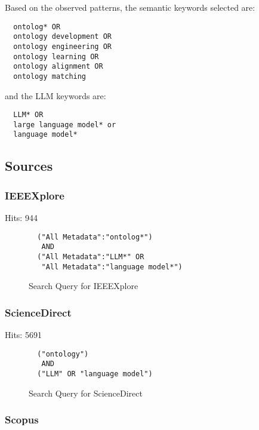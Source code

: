 \documentclass[a4paper,colorinlistoftodos]{article}
\begin{document}
Based on the observed patterns, the semantic keywords selected are:
\begin{lstlisting}
  ontolog* OR
  ontology development OR
  ontology engineering OR
  ontology learning OR
  ontology alignment OR
  ontology matching
\end{lstlisting}

and the LLM keywords are:
\begin{lstlisting}
  LLM* OR
  large language model* or
  language model*
\end{lstlisting}

\subsection{Sources}
\label{subsec:sources}

\subsubsection{IEEEXplore}
\label{subsubsec:ieeexplore}

Hits: 944

\begin{figure}[H]
\begin{lstlisting}
  ("All Metadata":"ontolog*")
   AND
  ("All Metadata":"LLM*" OR
   "All Metadata":"language model*")
\end{lstlisting}
  \label{fig:ieeexplore-query}
  \caption{Search Query for IEEEXplore}
\end{figure}

\subsubsection{ScienceDirect}
\label{subsubsec:sciencedirect}

Hits: 5691 \newline

\begin{figure}[H]
\begin{lstlisting}
  ("ontology")
   AND
  ("LLM" OR "language model")
\end{lstlisting}
  \label{fig:sciencedirect-query}
  \caption{Search Query for ScienceDirect}
\end{figure}

\subsubsection{Scopus}
\label{subsubsec:scopus}
\end{document}
